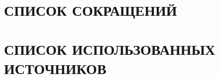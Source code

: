 \newcommand{\GPRImage}[4]{{
    \begin{center}
        \includegraphics[width=#4]
            {#3}
        \captionof{figure}{#2}
        \label{fig:#1}
    \end{center}
}}
\newcommand{\GPRSeeImageRef}[1]{{
    (см. рисунок \ref{fig:#1}.)
}}
\newcommand{\GPREquationDescItem}[2]{{
    \item[
        \ifdim\theGPREquationDescItemCount pt=0pt
            где
        \fi
    ] $#1$ -- #2
    \addtocounter{GPREquationDescItemCount}{1}
}}
\newcommand{\GPREquation}[2]{{
    \setcounter{GPREquationDescItemCount}{0}
    \begin{equation}
        #2
        \label{eq:#1}
    \end{equation}
}}
\newcommand{\GPREquationDesc}[1]{{
    \def \VarGPREquationDescItemUsed {0}
    \begin{itemize}
        #1
    \end{itemize}
}}




\newpage
{}
{}
\section*{СПИСОК СОКРАЩЕНИЙ}


\newpage
{}
{}
\section*{СПИСОК ИСПОЛЬЗОВАННЫХ ИСТОЧНИКОВ}



